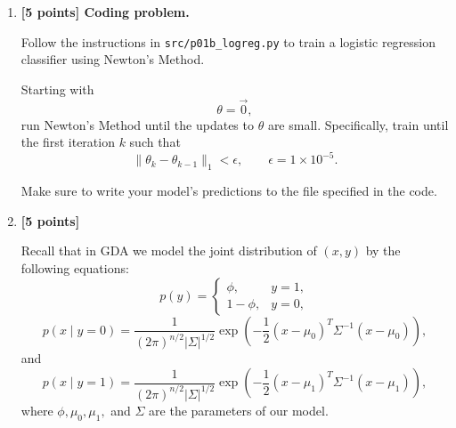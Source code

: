 \documentclass[10pt]{article}
\begin{document}
\begin{enumerate}
\begin{enumerate}[label=(\alph*)]
Therefore,
\[
\boxed{
H
=
\frac1m
\sum_{i=1}^m
h_i(1-h_i)
x^{(i)}(x^{(i)})^T
}.
\]

To show that $H$ is positive semidefinite, let
$z\in\mathbb{R}^n$ be arbitrary. Then
\[
\begin{aligned}
z^THz
&=
\frac1m
\sum_{i=1}^m
h_i(1-h_i)
z^Tx^{(i)}(x^{(i)})^Tz
\\
&=
\frac1m
\sum_{i=1}^m
h_i(1-h_i)
\left((x^{(i)})^Tz\right)^2.
\end{aligned}
\]

Since
\[
0<h_i<1,
\]
we have
\[
h_i(1-h_i)\ge0,
\]
and clearly
\[
\left((x^{(i)})^Tz\right)^2\ge0.
\]
Thus every term in the summation is nonnegative, so
\[
\boxed{
z^THz\ge0
}
\]
for every $z\in\mathbb{R}^n$.

Hence,
\[
\boxed{
H\succeq0
}.
\]


\item \textbf{[5 points] Coding problem.}

Follow the instructions in \texttt{src/p01b\_logreg.py} to train a
logistic regression classifier using Newton's Method.

Starting with
\[
\theta=\vec{0},
\]
run Newton's Method until the updates to $\theta$ are small.
Specifically, train until the first iteration $k$ such that
\[
\|\theta_k-\theta_{k-1}\|_1<\epsilon,
\qquad
\epsilon=1\times10^{-5}.
\]

Make sure to write your model's predictions to the file specified in
the code.


\item \textbf{[5 points]}

Recall that in GDA we model the joint distribution of $(x,y)$ by the
following equations:
\[
p(y)
=
\begin{cases}
\phi, & y=1,\\
1-\phi, & y=0,
\end{cases}
\]
\[
p(x\mid y=0)
=
\frac{1}
{(2\pi)^{n/2}|\Sigma|^{1/2}}
\exp\left(
-\frac12(x-\mu_0)^T\Sigma^{-1}(x-\mu_0)
\right),
\]
and
\[
p(x\mid y=1)
=
\frac{1}
{(2\pi)^{n/2}|\Sigma|^{1/2}}
\exp\left(
-\frac12(x-\mu_1)^T\Sigma^{-1}(x-\mu_1)
\right),
\]
where $\phi,\mu_0,\mu_1,$ and $\Sigma$ are the parameters of our model.


\end{enumerate}
\end{enumerate}
\end{document}
